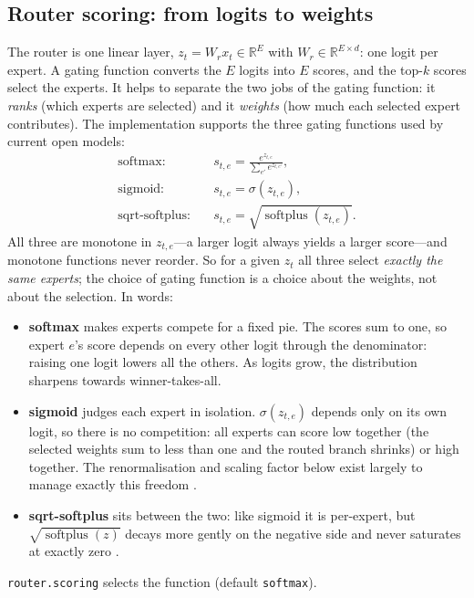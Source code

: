 \subsection{Router scoring: from logits to weights}
\label{app:moe-router}

The router is one linear layer, $z_t = W_r x_t \in \mathbb{R}^{E}$ with
$W_r \in \mathbb{R}^{E \times d}$: one logit per expert. A gating function
converts the $E$ logits into $E$ scores, and the top-$k$ scores select the
experts. It helps to separate the two jobs of the gating function: it
\emph{ranks} (which experts are selected) and it \emph{weights} (how much each
selected expert contributes). The implementation supports the three gating
functions used by current open models:
\begin{align}
  \text{softmax}:&\quad s_{t,e} = \frac{e^{z_{t,e}}}{\sum_{e'} e^{z_{t,e'}}}, \\
  \text{sigmoid}:&\quad s_{t,e} = \sigma(z_{t,e}), \\
  \text{sqrt-softplus}:&\quad s_{t,e} = \sqrt{\operatorname{softplus}(z_{t,e})}.
\end{align}
All three are monotone in $z_{t,e}$---a larger logit always yields a larger
score---and monotone functions never reorder. So for a given $z_t$ all three
select \emph{exactly the same experts}; the choice of gating function is a
choice about the weights, not about the selection. In words:
\begin{itemize}[leftmargin=1.4em]
  \item \textbf{softmax} makes experts compete for a fixed pie. The scores sum
        to one, so expert $e$'s score depends on every other logit through the
        denominator: raising one logit lowers all the others. As logits grow,
        the distribution sharpens towards winner-takes-all.
  \item \textbf{sigmoid} judges each expert in isolation. $\sigma(z_{t,e})$
        depends only on its own logit, so there is no competition: all experts
        can score low together (the selected weights sum to less than one and
        the routed branch shrinks) or high together. The renormalisation and
        scaling factor below exist largely to manage exactly this freedom
        \citep{deepseek2024v3}.
  \item \textbf{sqrt-softplus} sits between the two: like sigmoid it is
        per-expert, but $\sqrt{\operatorname{softplus}(z)}$ decays more gently
        on the negative side and never saturates at exactly zero
        \citep{deepseek2026v4}.
\end{itemize}
\texttt{router.scoring} selects the function (default \texttt{softmax}).

